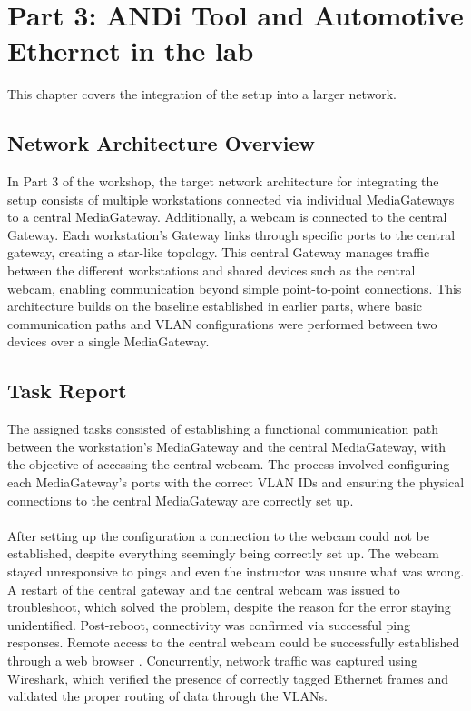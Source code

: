 \section{Part 3: ANDi Tool and Automotive Ethernet in the lab }
\label{sec:network-integration}

This chapter covers the integration of the setup into a larger network.

\subsection{Network Architecture Overview}
In Part 3 of the workshop, the target network architecture for integrating the setup consists of multiple workstations connected via individual MediaGateways to a central MediaGateway. Additionally, a webcam is connected to the central Gateway. Each workstation’s Gateway links through specific ports to the central gateway, creating a star-like topology. This central Gateway manages traffic between the different workstations and shared devices such as the central webcam, enabling communication beyond simple point-to-point connections. This architecture builds on the baseline established in earlier parts, where basic communication paths and VLAN configurations were performed between two devices over a single MediaGateway.

\subsection{Task Report}
The assigned tasks consisted of establishing a functional communication path between the workstation’s MediaGateway and the central MediaGateway, with the objective of accessing the central webcam. The process involved configuring each MediaGateway’s ports with the correct VLAN IDs and ensuring the physical connections to the central MediaGateway are correctly set up. \\\\
After setting up the configuration a connection to the webcam could not be established, despite everything seemingly being correctly set up. The webcam stayed unresponsive to pings and even the instructor was unsure what was wrong. A restart of the central gateway and the central webcam was issued to troubleshoot, which solved the problem, despite the reason for the error staying unidentified. Post-reboot, connectivity was confirmed via successful ping responses. Remote access to the central webcam could be successfully established through a web browser . Concurrently, network traffic was captured using Wireshark, which verified the presence of correctly tagged Ethernet frames and validated the proper routing of data through the VLANs. 

